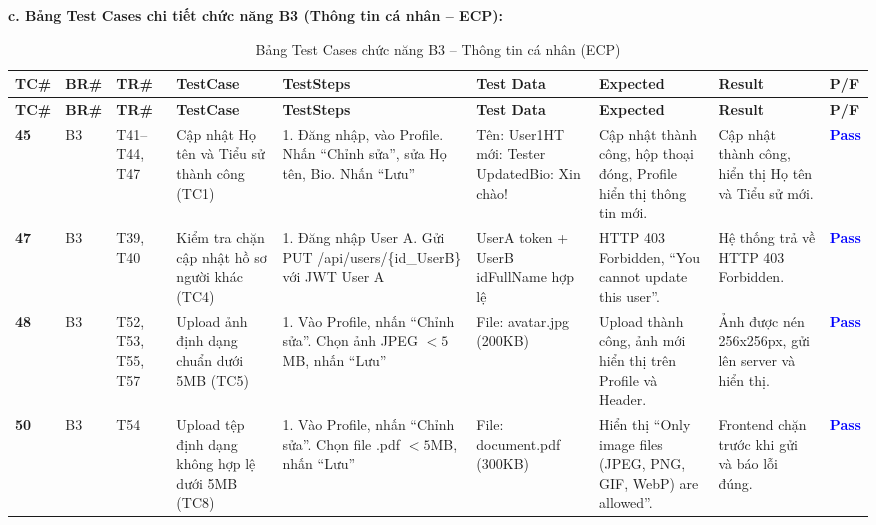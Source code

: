 \documentclass[11pt,a4paper]{article}
\begin{document}
\noindent\textbf{c. Bảng Test Cases chi tiết chức năng B3 (Thông tin cá nhân -- ECP):}
\begingroup
\scriptsize
\setlength{\tabcolsep}{3pt}
\begin{longtable}{|C{0.85cm}|C{0.7cm}|C{0.95cm}|L{2.0cm}|L{3.0cm}|L{2.25cm}|L{2.6cm}|L{2.5cm}|C{0.85cm}|}
\hline
{}
\textbf{TC\#} & \textbf{BR\#} & \textbf{TR\#} & \textbf{TestCase} & \textbf{TestSteps} & \textbf{Test Data} & \textbf{Expected} & \textbf{Result} & \textbf{P/F} \tabularnewline
\hline
\endfirsthead
\hline
{}
\textbf{TC\#} & \textbf{BR\#} & \textbf{TR\#} & \textbf{TestCase} & \textbf{TestSteps} & \textbf{Test Data} & \textbf{Expected} & \textbf{Result} & \textbf{P/F} \tabularnewline
\hline
\endhead
\hline
\endfoot
\hline
\caption{Bảng Test Cases chức năng B3 -- Thông tin cá nhân (ECP)}
\endlastfoot
\textbf{45} & B3 & T41--T44, T47 & Cập nhật Họ tên và Tiểu sử thành công (TC1) & 1. Đăng nhập, vào Profile. Nhấn ``Chỉnh sửa'', sửa Họ tên, Bio. Nhấn ``Lưu'' & Tên: User1\newline HT mới: Tester Updated\newline Bio: Xin chào! & Cập nhật thành công, hộp thoại đóng, Profile hiển thị thông tin mới. & Cập nhật thành công, hiển thị Họ tên và Tiểu sử mới. & \textcolor{blue}{\textbf{Pass}} \\ \hline
\textbf{47} & B3 & T39, T40 & Kiểm tra chặn cập nhật hồ sơ người khác (TC4) & 1. Đăng nhập User A. Gửi PUT /api/users/\{id\_UserB\} với JWT User A & UserA token + UserB id\newline FullName hợp lệ & HTTP 403 Forbidden, ``You cannot update this user''. & Hệ thống trả về HTTP 403 Forbidden. & \textcolor{blue}{\textbf{Pass}} \\ \hline
\textbf{48} & B3 & T52, T53, T55, T57 & Upload ảnh định dạng chuẩn dưới 5MB (TC5) & 1. Vào Profile, nhấn ``Chỉnh sửa''. Chọn ảnh JPEG $< 5$MB, nhấn ``Lưu'' & File: avatar.jpg (200KB) & Upload thành công, ảnh mới hiển thị trên Profile và Header. & Ảnh được nén 256x256px, gửi lên server và hiển thị. & \textcolor{blue}{\textbf{Pass}} \\ \hline
\textbf{50} & B3 & T54 & Upload tệp định dạng không hợp lệ dưới 5MB (TC8) & 1. Vào Profile, nhấn ``Chỉnh sửa''. Chọn file .pdf $< 5$MB, nhấn ``Lưu'' & File: document.pdf (300KB) & Hiển thị ``Only image files (JPEG, PNG, GIF, WebP) are allowed''. & Frontend chặn trước khi gửi và báo lỗi đúng. & \textcolor{blue}{\textbf{Pass}} \\ \hline

\end{longtable}
\end{document}
